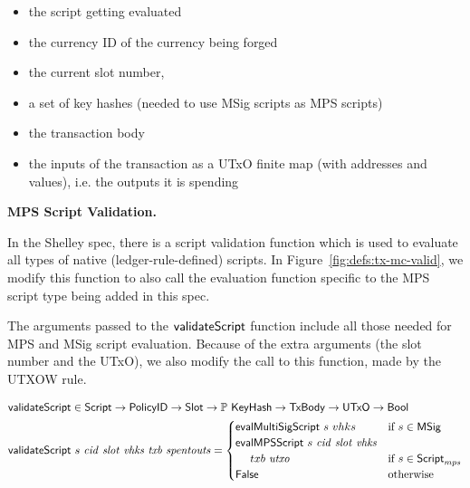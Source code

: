 \begin{itemize}
\item the script getting evaluated
\item the currency ID of the currency being forged
\item the current slot number,
\item a set of key hashes (needed to use MSig scripts as MPS scripts)
\item the transaction body
\item the inputs of the transaction as a UTxO finite map (with addresses and values),
i.e. the outputs it is spending
\end{itemize}


\textbf{MPS Script Validation.}

In the Shelley spec, there is a script validation function which
is used to evaluate all types of native (ledger-rule-defined) scripts.
In Figure~\ref{fig:defs:tx-mc-valid}, we modify this function to also call the
evaluation function specific to the MPS script type being added in this spec.

The arguments passed to the $\mathsf{validateScript}$ function include all those
needed for MPS and MSig script evaluation. Because of the extra arguments
(the slot number and the UTxO), we also modify the call to this function, made
by the UTXOW rule.

\begin{figure*}[htb]
    \begin{align*}
      \mathsf{validateScript} & \in\mathsf{Script}\to\mathsf{PolicyID}\to\mathsf{Slot}\to
      \mathbb{P}~\mathsf{KeyHash}\to\mathsf{TxBody}\to\mathsf{UTxO}\to\mathsf{Bool} \\
      \mathsf{validateScript} & ~s~\mathit{cid}~\mathit{slot}~\mathit{vhks}
       ~\mathit{txb}~\mathit{spentouts} =
                             \begin{cases}
                               \mathsf{evalMultiSigScript}~s~vhks & \text{if}~s \in\mathsf{MSig} \\
                               \mathsf{evalMPSScript}~s~\mathit{cid}~\mathit{slot}~\mathit{vhks} \\
                                ~~~~txb~\mathit{utxo} & \text{if}~s \in\mathsf{Script}_{mps} \\
                               \mathsf{False} & \text{otherwise}
                             \end{cases} \\
    \end{align*}
  \caption{Script Validation}
  \label{fig:defs:tx-mc-valid}
\end{figure*}


